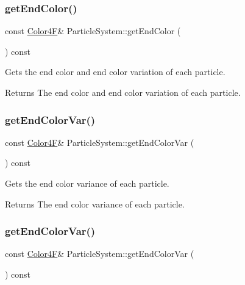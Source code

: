 \subsubsection{\texorpdfstring{get\+End\+Color()}{getEndColor()}\hspace{0.1cm}{\footnotesize\ttfamily [2/2]}}
{\footnotesize\ttfamily const \hyperlink{structColor4F}{Color4F}\& Particle\+System\+::get\+End\+Color (\begin{DoxyParamCaption}{ }\end{DoxyParamCaption}) const\hspace{0.3cm}{\ttfamily [inline]}}

Gets the end color and end color variation of each particle.

\begin{DoxyReturn}{Returns}
The end color and end color variation of each particle. 
\end{DoxyReturn}
\mbox{\label{classParticleSystem_a64ebc762eeee90b936bbcf63359b3fce}} 
\subsubsection{\texorpdfstring{get\+End\+Color\+Var()}{getEndColorVar()}\hspace{0.1cm}{\footnotesize\ttfamily [1/2]}}
{\footnotesize\ttfamily const \hyperlink{structColor4F}{Color4F}\& Particle\+System\+::get\+End\+Color\+Var (\begin{DoxyParamCaption}{ }\end{DoxyParamCaption}) const\hspace{0.3cm}{\ttfamily [inline]}}

Gets the end color variance of each particle.

\begin{DoxyReturn}{Returns}
The end color variance of each particle. 
\end{DoxyReturn}
\mbox{\label{classParticleSystem_a64ebc762eeee90b936bbcf63359b3fce}} 
\subsubsection{\texorpdfstring{get\+End\+Color\+Var()}{getEndColorVar()}\hspace{0.1cm}{\footnotesize\ttfamily [2/2]}}
{\footnotesize\ttfamily const \hyperlink{structColor4F}{Color4F}\& Particle\+System\+::get\+End\+Color\+Var (\begin{DoxyParamCaption}{ }\end{DoxyParamCaption}) const\hspace{0.3cm}{\ttfamily [inline]}}

